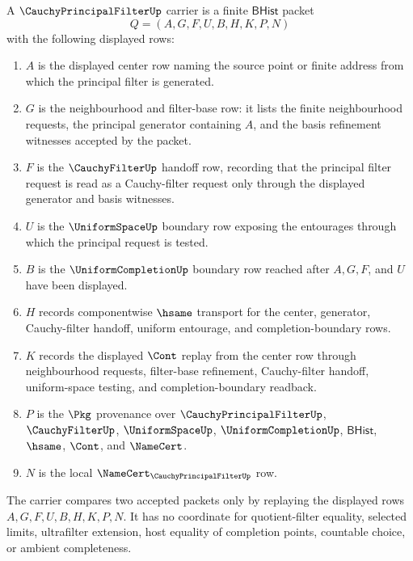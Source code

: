 \begin{definition}
\label{def:cauchy-principal-filter-carrier}
A $\CauchyPrincipalFilterUp$ carrier is a finite $\mathsf{BHist}$ packet
$$
Q=(A,G,F,U,B,H,K,P,N)
$$
with the following displayed rows:
\begin{enumerate}
\item $A$ is the displayed center row naming the source point or finite address from which the principal filter is generated.
\item $G$ is the neighbourhood and filter-base row: it lists the finite neighbourhood requests, the principal generator containing $A$, and the basis refinement witnesses accepted by the packet.
\item $F$ is the $\CauchyFilterUp$ handoff row, recording that the principal filter request is read as a Cauchy-filter request only through the displayed generator and basis witnesses.
\item $U$ is the $\UniformSpaceUp$ boundary row exposing the entourages through which the principal request is tested.
\item $B$ is the $\UniformCompletionUp$ boundary row reached after $A,G,F$, and $U$ have been displayed.
\item $H$ records componentwise $\hsame$ transport for the center, generator, Cauchy-filter handoff, uniform entourage, and completion-boundary rows.
\item $K$ records the displayed $\Cont$ replay from the center row through neighbourhood requests, filter-base refinement, Cauchy-filter handoff, uniform-space testing, and completion-boundary readback.
\item $P$ is the $\Pkg$ provenance over $\CauchyPrincipalFilterUp$, $\CauchyFilterUp$, $\UniformSpaceUp$, $\UniformCompletionUp$, $\mathsf{BHist}$, $\hsame$, $\Cont$, and $\NameCert$.
\item $N$ is the local $\NameCert_{\CauchyPrincipalFilterUp}$ row.
\end{enumerate}
The carrier compares two accepted packets only by replaying the displayed rows $A,G,F,U,B,H,K,P,N$. It has no coordinate for quotient-filter equality, selected limits, ultrafilter extension, host equality of completion points, countable choice, or ambient completeness.
\end{definition}

